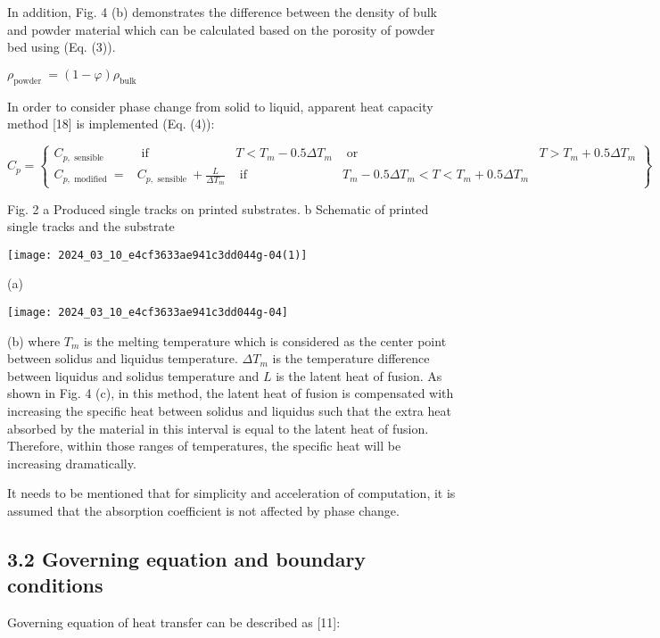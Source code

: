 \documentclass[10pt]{article}
\begin{document}
In addition, Fig. 4 (b) demonstrates the difference between the density of bulk and powder material which can be calculated based on the porosity of powder bed using (Eq. (3)).

$\rho_{\text {powder }}=(1-\varphi) \rho_{\text {bulk }}$

In order to consider phase change from solid to liquid, apparent heat capacity method [18] is implemented (Eq. (4)):

$C_{p}=\left\{\begin{array}{ccccc}C_{p, \text { sensible }} & \text { if } & T<T_{m}-0.5 \Delta T_{m} & \text { or } & T>T_{m}+0.5 \Delta T_{m} \\ C_{p, \text { modified }}= & C_{p, \text { sensible }}+\frac{L}{\Delta T_{m}} & \text { if } & T_{m}-0.5 \Delta T_{m}<T<T_{m}+0.5 \Delta T_{m}\end{array}\right\}$

Fig. 2 a Produced single tracks on printed substrates. b Schematic of printed single tracks and the substrate

\begin{center}
\texttt{[image: 2024\_03\_10\_e4cf3633ae941c3dd044g-04(1)]}
\end{center}

(a)

\begin{center}
\texttt{[image: 2024\_03\_10\_e4cf3633ae941c3dd044g-04]}
\end{center}

(b) where $T_{m}$ is the melting temperature which is considered as the center point between solidus and liquidus temperature. $\Delta T_{m}$ is the temperature difference between liquidus and solidus temperature and $L$ is the latent heat of fusion. As shown in Fig. 4 (c), in this method, the latent heat of fusion is compensated with increasing the specific heat between solidus and liquidus such that the extra heat absorbed by the material in this interval is equal to the latent heat of fusion. Therefore, within those ranges of temperatures, the specific heat will be increasing dramatically.

It needs to be mentioned that for simplicity and acceleration of computation, it is assumed that the absorption coefficient is not affected by phase change.

\subsection*{3.2 Governing equation and boundary conditions}
Governing equation of heat transfer can be described as [11]:
\end{document}
